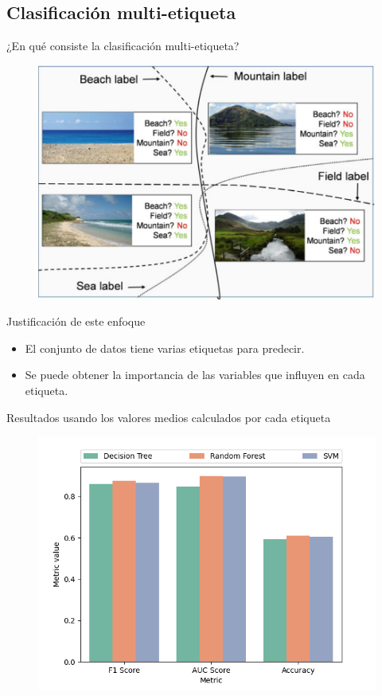 \documentclass{beamer}
\begin{document}
	\subsection{Clasificación multi-etiqueta}
		\begin{frame}{¿En qué consiste la clasificación multi-etiqueta?}
 			\begin{figure}
				\includegraphics[scale=0.4]{../multilabel-class}
			\end{figure}
		\end{frame}
		\begin{frame}{Justificación de este enfoque}
			\begin{itemize}
				\item El conjunto de datos tiene varias etiquetas para predecir.
				\item Se puede obtener la importancia de las variables que influyen en cada etiqueta.
			\end{itemize}
		\end{frame}
		\begin{frame}{Resultados usando los valores medios calculados por cada etiqueta}
			\begin{figure}
				\includegraphics[scale=0.5]{br_test_metrics}
			\end{figure}
		\end{frame}
\end{document}
